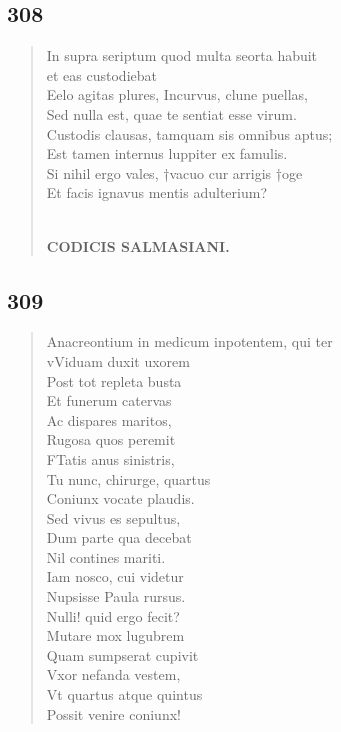 \documentclass[11pt, a4paper]{report}
\begin{document}
            \subsection*{308}
      \begin{verse}
      In supra seriptum quod multa seorta habuit \\ et eas custodiebat \\ Eelo  \lbrack agitas \rbrack  plures, Incurvus, clune puellas, \\ Sed nulla est, quae te sentiat esse virum. \\ Custodis clausas, tamquam sis omnibus aptus; \\ Est tamen internus luppiter ex famulis. \\ Si nihil ergo vales, †vacuo cur arrigis †oge \\ Et facis ignavus mentis adulterium? \\ 
        ﻿\pagebreak 
    \begin{center} \textbf{CODICIS SALMASIANI.} \end{center} \marginpar{[259]} 
      \end{verse}
  
            \subsection*{309}
      \begin{verse}
      Anacreontium in medicum inpotentem, qui ter \\ vViduam duxit uxorem \\ Post tot repleta busta \\ Et funerum catervas \\ Ac dispares maritos, \\ Rugosa quos peremit \\ FTatis anus sinistris, \\ Tu nunc, chirurge, quartus \\ Coniunx vocate plaudis. \\ Sed vivus es sepultus, \\ Dum parte qua decebat \\ Nil contines mariti. \\ Iam nosco, cui videtur \\ Nupsisse Paula rursus. \\ Nulli! quid ergo fecit? \\ Mutare mox lugubrem \\ Quam sumpserat cupivit \\ Vxor nefanda vestem, \\ Vt quartus atque quintus \\ Possit venire coniunx! \\ 
      \end{verse}
  
\end{document}
